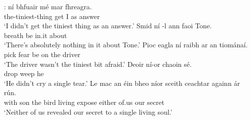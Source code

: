\documentclass[output=paper,colorlinks,citecolor=brown]{langscibook}
\begin{document}
:\label{ex:npinarr2}
\ea
{} ní bhfuair mé {\gapline} mar fhreagra. \\
     {the-tiniest-thing} {\no} {get\past} I {} as answer \\
\glt `I didn't get the tiniest thing as an answer.'
\ex
\gll Smid ní -l {\gapline} ann faoi Tone. \\
     breath {\no} {be\pres} {} in.it about {} \\
\glt `There's absolutely nothing in it about Tone.'
\ex
\gll Pioc eagla ní raibh {\gapline} ar an tiománaí. \\
     {pick} fear {\no} {be\past} {} on the driver \\
\glt `The driver wasn't the tiniest bit afraid.'
\ex
\gll Deoir ní-or chaoin sé. {\gapline} \\
     drop {\nior} {weep\past} he {} \\
\glt `He didn't cry a single tear.'
\ex
\gll Le mac an éin bheo níor sceith ceachtar againn ár rún. \\
     with son the {bird\gen} living {\nior} {expose\past} either of.us our secret\\
\glt `Neither of us revealed our secret to a single living soul.'
\z
\z
{}
\end{document}

